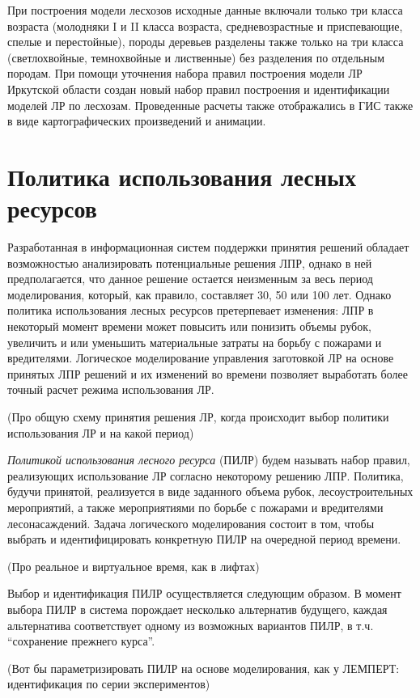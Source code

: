 При построения модели лесхозов исходные данные включали только три класса возраста (молодняки I и II класса возраста, средневозрастные и приспевающие, спелые и перестойные), породы деревьев разделены также только на три класса (светлохвойные, темнохвойные и лиственные) без разделения по отдельным породам. При помощи уточнения набора правил построения модели ЛР Иркутской области создан новый набор правил построения и идентификации моделей ЛР по лесхозам. Проведенные расчеты также отображались в ГИС также в виде картографических произведений и анимации.

\section{Политика использования лесных ресурсов}

Разработанная в \cite{dissAsya} информационная систем поддержки принятия решений обладает возможностью анализировать потенциальные решения ЛПР, однако в ней предполагается, что данное решение остается неизменным за весь период моделирования, который, как правило, составляет 30, 50 или 100 лет. Однако политика использования лесных ресурсов претерпевает изменения: ЛПР в некоторый момент времени может повысить или понизить объемы рубок, увеличить и или уменьшить материальные затраты на борьбу с пожарами и вредителями. Логическое моделирование управления заготовкой ЛР на основе принятых ЛПР решений и их изменений во времени позволяет выработать более точный расчет режима использования ЛР.

(Про общую схему принятия решения ЛР, когда происходит выбор политики использования ЛР и на какой период)

\emph{Политикой использования лесного ресурса} (ПИЛР) будем называть набор правил, реализующих использование ЛР согласно некоторому решению ЛПР. Политика, будучи принятой, реализуется в виде заданного объема рубок, лесоустроительных мероприятий, а также мероприятиями по борьбе с пожарами и вредителями лесонасаждений. Задача логического моделирования состоит в том, чтобы выбрать и идентифицировать конкретную ПИЛР на очередной период времени.

(Про реальное и виртуальное время, как в лифтах)

Выбор и идентификация ПИЛР осуществляется следующим образом. В момент выбора ПИЛР в система порождает несколько альтернатив будущего, каждая альтернатива соответствует одному из возможных вариантов ПИЛР, в т.ч. ``сохранение прежнего курса''.

(Вот бы параметризировать ПИЛР на основе моделирования, как у ЛЕМПЕРТ: идентификация по серии экспериментов)


